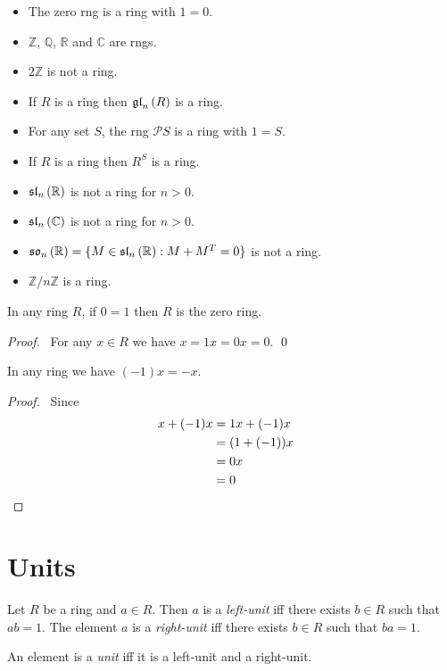 \begin{ex}
\begin{itemize}
\item The zero rng is a ring with $1 = 0$.
\item $\mathbb{Z}$, $\mathbb{Q}$, $\mathbb{R}$ and $\mathbb{C}$ are rngs.
\item $2 \mathbb{Z}$ is not a ring.
\item If $R$ is a ring then $\gl{n}{R}$ is a ring.
\item For any set $S$, the rng $\mathcal{P} S$ is a ring with $1 = S$.
\item If $R$ is a ring then $R^S$ is a ring.
\item $\sl{n}{\mathbb{R}}$ is not a ring for $n > 0$.
\item $\sl{n}{\mathbb{C}}$ is not a ring for $n > 0$.
\item $\so{n}{\mathbb{R}} = \{ M \in \sl{n}{\mathbb{R}} : M + M^T = 0 \}$ is not a ring.
\item $\mathbb{Z} / n \mathbb{Z}$ is a ring.
\end{itemize}
\end{ex}

\begin{prop}
In any ring $R$, if $0 = 1$ then $R$ is the zero ring.
\end{prop}

\begin{proof}
\pf\ For any $x \in R$ we have $x = 1x = 0x = 0$. \qed
\end{proof}

\begin{prop}
In any ring we have $(-1)x = -x$.
\end{prop}

\begin{proof}
\pf\ Since
\begin{align*}
x + (-1)x & = 1x + (-1) x \\
& = (1 + (-1))x \\
& = 0x \\
& = 0 & \qed
\end{align*}
\end{proof}

\section{Units}

\begin{df}
Let $R$ be a ring and $a \in R$. Then $a$ is a \emph{left-unit} iff there exists $b \in R$ such that $ab = 1$. The element $a$ is a \emph{right-unit} iff there exists $b \in R$ such that $ba = 1$.

An element is a \emph{unit} iff it is a left-unit and a right-unit.
\end{df}

